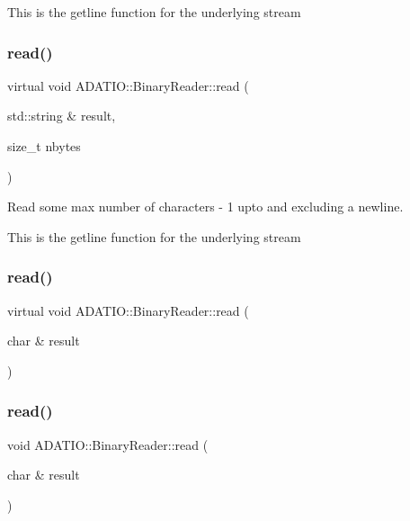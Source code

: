 This is the getline function for the underlying stream \mbox{\label{classADATIO_1_1BinaryReader_a4d79cabea18fccc818eaf2c45ed21b1f}} 
\subsubsection{\texorpdfstring{read()}{read()}\hspace{0.1cm}{\footnotesize\ttfamily [3/33]}}
{\footnotesize\ttfamily virtual void A\+D\+A\+T\+I\+O\+::\+Binary\+Reader\+::read (\begin{DoxyParamCaption}\item[{std\+::string \&}]{result,  }\item[{size\+\_\+t}]{nbytes }\end{DoxyParamCaption})\hspace{0.3cm}{\ttfamily [virtual]}}



Read some max number of characters -\/ 1 upto and excluding a newline. 

This is the getline function for the underlying stream \mbox{\label{classADATIO_1_1BinaryReader_a04c653824b3819b4b02ea5eed6fd57f5}} 
\subsubsection{\texorpdfstring{read()}{read()}\hspace{0.1cm}{\footnotesize\ttfamily [4/33]}}
{\footnotesize\ttfamily virtual void A\+D\+A\+T\+I\+O\+::\+Binary\+Reader\+::read (\begin{DoxyParamCaption}\item[{char \&}]{result }\end{DoxyParamCaption})\hspace{0.3cm}{\ttfamily [virtual]}}

\mbox{\label{classADATIO_1_1BinaryReader_ae570afc4063058ada2653bbe7b7d7998}} 
\subsubsection{\texorpdfstring{read()}{read()}\hspace{0.1cm}{\footnotesize\ttfamily [5/33]}}
{\footnotesize\ttfamily void A\+D\+A\+T\+I\+O\+::\+Binary\+Reader\+::read (\begin{DoxyParamCaption}\item[{char \&}]{result }\end{DoxyParamCaption})\hspace{0.3cm}{\ttfamily [virtual]}}

